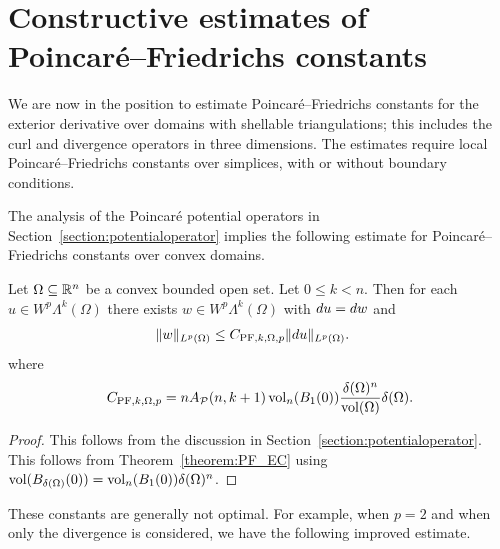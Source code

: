 \documentclass[10pt,a4paper]{article}
\begin{document}
\section{Constructive estimates of Poincar\'e--Friedrichs constants}\label{section:poincarefriedrichs}

We are now in the position to estimate Poincar\'e--Friedrichs constants for the exterior derivative over domains with shellable triangulations; this includes the curl and divergence operators in three dimensions. 
The estimates require local Poincar\'e--Friedrichs constants over simplices, 
with or without boundary conditions. 

The analysis of the Poincar\'e potential operators in Section~\ref{section:potentialoperator}
implies the following estimate for Poincar\'e--Friedrichs constants over convex domains. 

\begin{lemma}\label{lemma:PFexteriorsimplex}
    Let $\Omega \subseteq {\mathbb R}^{n}$ be a convex bounded open set. 
    Let $0 \leq k < n$. 
    Then for each $u \in W^{p}\Lambda^{k}(\Omega)$ 
    there exists $w \in W^{p}\Lambda^{k}(\Omega)$ 
    with $d u = d w$ and 
    \begin{align*}
        \| w \|_{L^{p}(\Omega)}
        &
        \leq 
        C_{{{\rm PF}},k,\Omega,p}
        \| d u \|_{L^{p}(\Omega)}
        .
    \end{align*}
    where 
    \begin{align*}
        C_{{{\rm PF}},k,\Omega,p} 
        = 
        n A_{{\mathcal P}}(n,k+1) 
        \operatorname{vol}_{n}(B_1(0)) 
        \frac{ {\delta}(\Omega)^{n} }{ \operatorname{vol}(\Omega) } 
        {\delta}(\Omega)
        .
    \end{align*}
\end{lemma}
\begin{proof}
    This follows from the discussion in Section~\ref{section:potentialoperator}.
    This follows from Theorem~\ref{theorem:PF_EC} using $\operatorname{vol}(B_{{\delta}(\Omega)}(0)) = \operatorname{vol}_{n}(B_1(0)) {\delta}(\Omega)^{n}$.
\end{proof}

These constants are generally not optimal. 
For example, when $p=2$ and when only the divergence is considered, 
we have the following improved estimate. 
\end{document}

